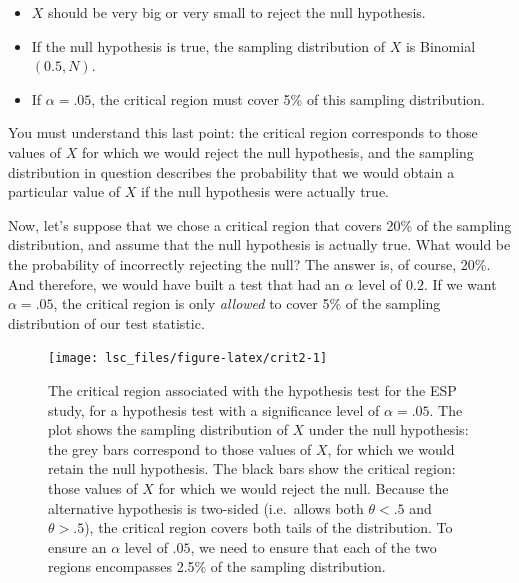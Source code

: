 \documentclass[
]{book}
\providecommand{\tightlist}{%
  \setlength{\itemsep}{0pt}\setlength{\parskip}{0pt}}
\theoremstyle{definition}
\theoremstyle{definition}
\theoremstyle{definition}
\theoremstyle{definition}
\theoremstyle{remark}
\begin{document}
\begin{itemize}
\tightlist
\item
  \(X\) should be very big or very small to reject the null hypothesis.
\item
  If the null hypothesis is true, the sampling distribution of \(X\) is Binomial\((0.5, N)\).
\item
  If \(\alpha =.05\), the critical region must cover 5\% of this sampling distribution.
\end{itemize}

You must understand this last point: the critical region corresponds to those values of \(X\) for which we would reject the null hypothesis, and the sampling distribution in question describes the probability that we would obtain a particular value of \(X\) if the null hypothesis were actually true.

Now, let's suppose that we chose a critical region that covers 20\% of the sampling distribution, and assume that the null hypothesis is actually true. What would be the probability of incorrectly rejecting the null? The answer is, of course, 20\%. And therefore, we would have built a test that had an \(\alpha\) level of \(0.2\). If we want \(\alpha = .05\), the critical region is only \emph{allowed} to cover 5\% of the sampling distribution of our test statistic.



\begin{figure}

{\centering \texttt{[image: lsc\_files/figure-latex/crit2-1]} 

}

\caption{The critical region associated with the hypothesis test for the ESP study, for a hypothesis test with a significance level of \(\alpha = .05\). The plot shows the sampling distribution of \(X\) under the null hypothesis: the grey bars correspond to those values of \(X\), for which we would retain the null hypothesis. The black bars show the critical region: those values of \(X\) for which we would reject the null. Because the alternative hypothesis is two-sided (i.e.~allows both \(\theta <.5\) and \(\theta >.5\)), the critical region covers both tails of the distribution. To ensure an \(\alpha\) level of \(.05\), we need to ensure that each of the two regions encompasses 2.5\% of the sampling distribution.}\label{fig:crit2}
\end{figure}
\end{document}

